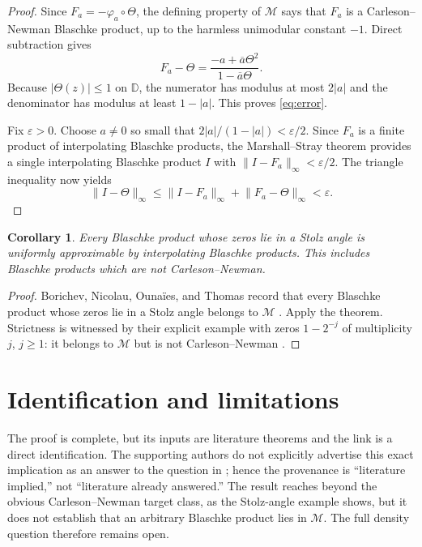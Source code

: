 \documentclass[10pt]{article}
\newtheorem{corollary}{Corollary}
\newcommand{\D}{\mathbb D}
\newcommand{\M}{\mathcal M}
\newcommand{\norm}[1]{\lVert #1\rVert_\infty}
\begin{document}
\begin{proof}
Since $F_a=-\varphi_a\circ\Theta$, the defining property of $\M$ says that
$F_a$ is a Carleson--Newman Blaschke product, up to the harmless unimodular
constant $-1$.  Direct subtraction gives
\[
 F_a-\Theta
 =\frac{-a+\overline a\Theta^2}{1-\overline a\Theta}.
\]
Because $|\Theta(z)|\le1$ on $\D$, the numerator has modulus at most $2|a|$
and the denominator has modulus at least $1-|a|$.  This proves
\eqref{eq:error}.

Fix $\varepsilon>0$.  Choose $a\ne0$ so small that
$2|a|/(1-|a|)<\varepsilon/2$.  Since $F_a$ is a finite product of
interpolating Blaschke products, the Marshall--Stray theorem provides a single
interpolating Blaschke product $I$ with
$\norm{I-F_a}<\varepsilon/2$.  The triangle inequality now yields
\[
 \norm{I-\Theta}
 \le \norm{I-F_a}+\norm{F_a-\Theta}<\varepsilon.
\]
\end{proof}

\begin{corollary}
Every Blaschke product whose zeros lie in a Stolz angle is uniformly
approximable by interpolating Blaschke products.  This includes Blaschke
products which are not Carleson--Newman.
\end{corollary}

\begin{proof}
Borichev, Nicolau, Ouna\"ies, and Thomas record that every Blaschke product
whose zeros lie in a Stolz angle belongs to $\M$ \cite[Section 6.5]{BNOT2025}.
Apply the theorem.  Strictness is witnessed by their explicit example with
zeros $1-2^{-j}$ of multiplicity $j$, $j\ge1$: it belongs to $\M$ but is not
Carleson--Newman \cite[Proposition 6.11 and the paragraph following it]{BNOT2025}.
\end{proof}

\section*{Identification and limitations}

The proof is complete, but its inputs are literature theorems and the link is
a direct identification.  The supporting authors do not explicitly advertise
this exact implication as an answer to the question in \cite{CGP2015}; hence
the provenance is ``literature implied,'' not ``literature already answered.''
The result reaches beyond the obvious Carleson--Newman target class, as the
Stolz-angle example shows, but it does not establish that an arbitrary
Blaschke product lies in $\M$.  The full density question therefore remains
open.
\end{document}

